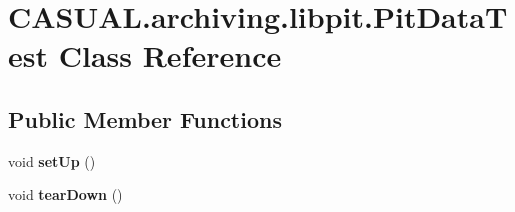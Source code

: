 \hypertarget{classCASUAL_1_1archiving_1_1libpit_1_1PitDataTest}{\section{C\-A\-S\-U\-A\-L.\-archiving.\-libpit.\-Pit\-Data\-Test Class Reference}
\label{classCASUAL_1_1archiving_1_1libpit_1_1PitDataTest}
}
\subsection*{Public Member Functions}
\begin{DoxyCompactItemize}
\item 
\hypertarget{classCASUAL_1_1archiving_1_1libpit_1_1PitDataTest_ab54388e623b45dfbe358c9b10366e045}{void {\bfseries set\-Up} ()}\label{classCASUAL_1_1archiving_1_1libpit_1_1PitDataTest_ab54388e623b45dfbe358c9b10366e045}

\item 
\hypertarget{classCASUAL_1_1archiving_1_1libpit_1_1PitDataTest_a6aa879dd9e6337e24cdd1d0a745dc33c}{void {\bfseries tear\-Down} ()}\label{classCASUAL_1_1archiving_1_1libpit_1_1PitDataTest_a6aa879dd9e6337e24cdd1d0a745dc33c}


\end{DoxyCompactItemize}
